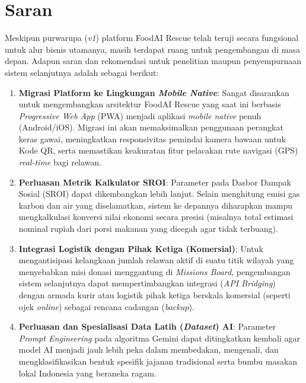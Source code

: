 \section{Saran}

Meskipun purwarupa (\textit{v1}) platform FoodAI Rescue telah teruji secara fungsional untuk alur bisnis utamanya, masih terdapat ruang untuk pengembangan di masa depan. Adapun saran dan rekomendasi untuk penelitian maupun penyempurnaan sistem selanjutnya adalah sebagai berikut:

\begin{enumerate}[label=\arabic*.]
    \item \textbf{Migrasi Platform ke Lingkungan \textit{Mobile Native}}: Sangat disarankan untuk mengembangkan arsitektur FoodAI Rescue yang saat ini berbasis \textit{Progressive Web App} (PWA) menjadi aplikasi \textit{mobile native} penuh (Android/iOS). Migrasi ini akan memaksimalkan penggunaan perangkat keras gawai, meningkatkan responsivitas pemindai kamera bawaan untuk Kode QR, serta memastikan keakuratan fitur pelacakan rute navigasi (GPS) \textit{real-time} bagi relawan.
    \item \textbf{Perluasan Metrik Kalkulator SROI}: Parameter pada Dasbor Dampak Sosial (SROI) dapat dikembangkan lebih lanjut. Selain menghitung emisi gas karbon dan air yang diselamatkan, sistem ke depannya diharapkan mampu mengkalkulasi konversi nilai ekonomi secara presisi (misalnya total estimasi nominal rupiah dari porsi makanan yang dicegah agar tidak terbuang).
    \item \textbf{Integrasi Logistik dengan Pihak Ketiga (Komersial)}: Untuk mengantisipasi kelangkaan jumlah relawan aktif di suatu titik wilayah yang menyebabkan misi donasi menggantung di \textit{Missions Board}, pengembangan sistem selanjutnya dapat mempertimbangkan integrasi (\textit{API Bridging}) dengan armada kurir atau logistik pihak ketiga berskala komersial (seperti ojek \textit{online}) sebagai rencana cadangan (\textit{backup}). 
    \item \textbf{Perluasan dan Spesialisasi Data Latih (\textit{Dataset}) AI}: Parameter \textit{Prompt Engineering} pada algoritma Gemini dapat ditingkatkan kembali agar model AI menjadi jauh lebih peka dalam membedakan, mengenali, dan mengklasifikasikan bentuk spesifik jajanan tradisional serta bumbu masakan lokal Indonesia yang beraneka ragam.
\end{enumerate}